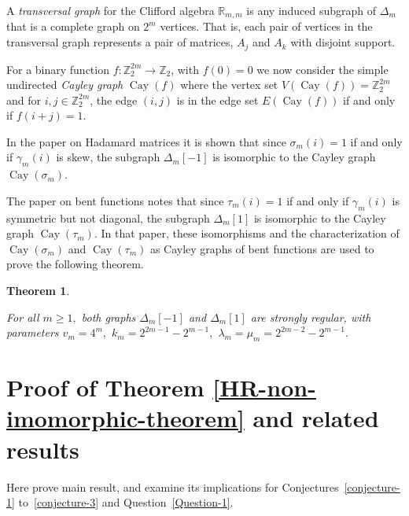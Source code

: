 \documentclass[12pt,a4paper]{article}
\newcommand{\mb}[1]{\mathbb{#1}}
\newcommand{\Cay}{\operatorname{Cay}}
\newcommand{\R}{\mb{R}}
\newcommand{\Z}{\mb{Z}}
\newcommand{\To}{\rightarrow}
\newtheorem{Theorem}{Theorem}
\begin{document}
A \emph{transversal graph} for the Clifford algebra $\R_{m,m}$
is any induced subgraph of $\varDelta_m$ that is a complete graph on $2^m$ vertices.
That is, each pair of vertices in the transversal graph represents a pair of matrices,
$A_j$ and $A_k$ with disjoint support.

For a binary function $f : \Z_2^{2 m} \To \Z_2$, with $f(0)=0$ we now consider the simple undirected \emph{Cayley graph} $\Cay(f)$  \cite[3.1]{BerC99}
where the vertex set $V(\Cay(f)) = \Z_2^{2 m}$ and for $i,j \in \Z_2^{2 m}$, the edge $(i,j)$ is in the edge set $E(\Cay(f))$ if and only if $f(i+j)=1$.

In the paper on Hada\-mard matrices \cite{Leo14Constructions} it is shown that
since $\sigma_m(i)=1$ if and only if $\gamma_m(i)$ is skew,
the subgraph $\varDelta_m[-1]$ is isomorphic to the Cayley graph $\Cay(\sigma_m)$.

The paper on bent functions \cite{Leo15Twin} notes that 
since $\tau_m(i) = 1$ if and only if $\gamma_m(i)$ is symmetric but not diagonal,
the subgraph $\varDelta_m[1]$ is isomorphic to the Cayley graph $\Cay(\tau_m)$.
In that paper, these isomorphisms and the characterization of $\Cay(\sigma_m)$ and $\Cay(\tau_m)$ 
as Cayley graphs of bent functions are used to prove the following theorem. 
\begin{Theorem}\label{Twins-are-strongly-regular-theorem}
\cite[Theorem 10]{Leo15Twin} 

For all $m \geqslant 1,$
both graphs $\varDelta_m[-1]$ and $\varDelta_m[1]$ are strongly regular, with parameters
$v_m = 4^m,$ $k_m = 2^{2 m - 1} - 2^{m - 1},$ $\lambda_m=\mu_m=2^{2 m - 2} - 2^{m - 1}.$
%
\end{Theorem}

\section{Proof of Theorem \ref{HR-non-imomorphic-theorem} and related results}
\label{sec-Results}
Here prove main result, and examine its implications for Conjectures~\ref{conjecture-1} to~\ref{conjecture-3} and Question~\ref{Question-1}.
\end{document}
